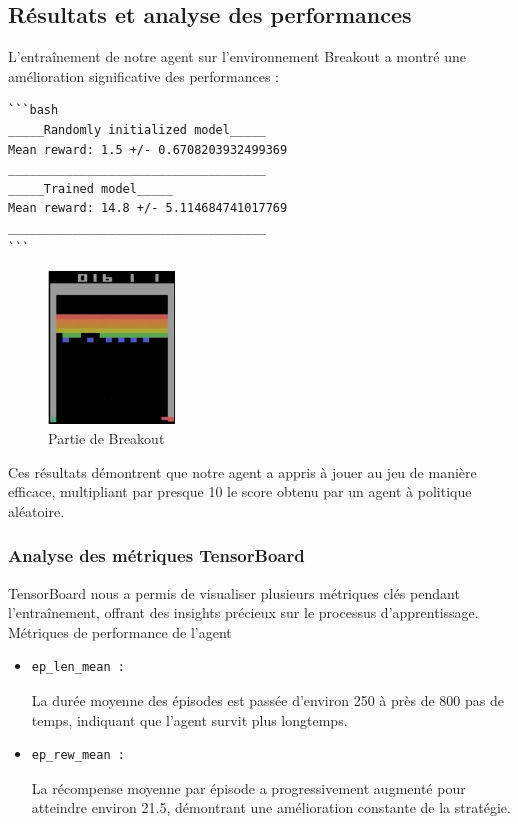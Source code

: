 \documentclass{article}
\begin{document}
\subsection{Résultats et analyse des performances}

\quad L'entraînement de notre agent sur l'environnement Breakout a montré une amélioration significative des performances :
\begin{verbatim}
```bash
_____Randomly initialized model_____
Mean reward: 1.5 +/- 0.6708203932499369
____________________________________
_____Trained model_____
Mean reward: 14.8 +/- 5.114684741017769
____________________________________
```
\end{verbatim}

\clearpage

\begin{figure}[ht]
    \centering
    \includegraphics[width=0.3\textwidth]{6.png}
    \caption{Partie de Breakout}
\end{figure}

Ces résultats démontrent que notre agent a appris à jouer au jeu de manière efficace, multipliant par presque 10 le score obtenu par un agent à politique aléatoire.

    \subsubsection{Analyse des métriques TensorBoard}
    
    \quad TensorBoard nous a permis de visualiser plusieurs métriques clés pendant l'entraînement, offrant des insights précieux sur le processus d'apprentissage.\\

        Métriques de performance de l'agent
        
        \begin{itemize} 
            \item \begin{verbatim}ep_len_mean :\end{verbatim}La durée moyenne des épisodes est passée d'environ 250 à près de 800 pas de temps, indiquant que l'agent survit plus longtemps.
            \item \begin{verbatim}ep_rew_mean :\end{verbatim}La récompense moyenne par épisode a progressivement augmenté pour atteindre environ 21.5, démontrant une amélioration constante de la stratégie.
        \end{itemize}
        
\end{document}
